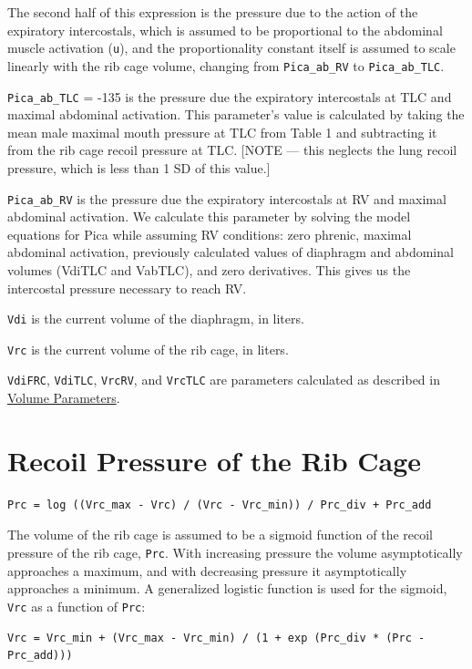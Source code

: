 \documentclass[12pt,openany,oneside]{book}
\begin{document}
The second half of this expression is the pressure due to the action
of the expiratory intercostals, which is assumed to be proportional to
the abdominal muscle activation (\verb~u~), and the proportionality
constant itself is assumed to scale linearly with the rib cage volume,
changing from \verb~Pica_ab_RV~ to \verb~Pica_ab_TLC~.

\verb~Pica_ab_TLC~ = -135 is the pressure due the expiratory
intercostals at TLC and maximal abdominal activation.  This
parameter's value is calculated by taking the mean male maximal mouth
pressure at TLC from \citet{Ratnovsky200882} Table 1 and subtracting
it from the rib cage recoil pressure at TLC.  [NOTE --- this neglects
the lung recoil pressure, which is less than 1 SD of this value.]

\verb~Pica_ab_RV~ is the pressure due the expiratory intercostals at
RV and maximal abdominal activation.  We calculate this parameter by
solving the model equations for Pica while assuming RV conditions:
zero phrenic, maximal abdominal activation, previously calculated
values of diaphragm and abdominal volumes (VdiTLC and VabTLC), and
zero derivatives.  This gives us the intercostal pressure necessary to
reach RV.

\verb~Vdi~ is the current volume of the diaphragm, in liters.

\verb~Vrc~ is the current volume of the rib cage, in liters.

\verb~VdiFRC~, \verb~VdiTLC~, \verb~VrcRV~, and \verb~VrcTLC~ are
parameters calculated as described in
\hyperref[Volume Parameters]{Volume Parameters}.

\section{Recoil Pressure of the Rib Cage}
\begin{verbatim}
Prc = log ((Vrc_max - Vrc) / (Vrc - Vrc_min)) / Prc_div + Prc_add
\end{verbatim}

The volume of the rib cage is assumed to be a sigmoid function of the
recoil pressure of the rib cage, \verb~Prc~.  With increasing pressure
the volume asymptotically approaches a maximum, and with decreasing
pressure it asymptotically approaches a minimum.  A generalized
logistic function is used for the sigmoid, \verb~Vrc~ as a function of
\verb~Prc~:

\begin{verbatim}
Vrc = Vrc_min + (Vrc_max - Vrc_min) / (1 + exp (Prc_div * (Prc - Prc_add))) 
\end{verbatim}
\end{document}
